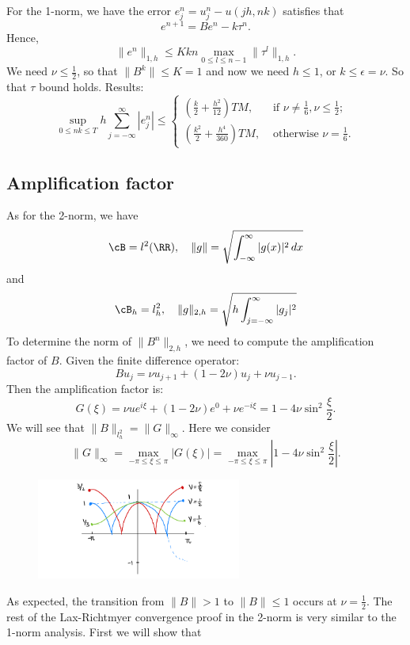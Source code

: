 For the 1-norm, we have the error $e_j^n = u_j^n - u(jh, nk)$ satisfies that 
\[
    e^{n+1} = B e^n - k \tau^n. 
\]
Hence, 
\[
    \|e^n\|_{1,h} \le K kn \max_{0\le l\le n-1} \|\tau^l\|_{1,h}. 
\]
We need $\nu\le \frac{1}{2}$, so that $\|B^k\|\le K =1$ and now we need $h\le 1$, or $k\le \epsilon = \nu$.  So that $\tau$ bound holds. Results: 
\[
    \sup_{0\le nk\le T} h \sum_{j=-\infty}^{\infty} |e_j^n| \le \begin{cases}
        \left( \frac{k}{2} + \frac{h^2}{12} \right)TM , &\text{ if } \nu \neq \frac{1}{6}, \nu \le \frac{1}{2} ;\\
        \left( \frac{k^2}{2} + \frac{h^4}{360} \right) TM, &\text{ otherwise } \nu = \frac{1}{6} .
    \end{cases} 
\]

\subsection{Amplification factor} 
As for the 2-norm,  we have 
\[
    \cB = l^2 (\RR), \quad \|g\| = \sqrt{\int_{-\infty}^{\infty} |g(x)|^2\, dx } 
\]
and 
\[
    \cB_h = l_h^2, \quad \|g\|_{2,h} = \sqrt{h \int_{j=-\infty}^{\infty} |g_j|^2 } 
\]
To determine the norm of $\|B^n\|_{2,h}$, we need to compute the amplification factor of $B$.  Given the finite difference operator: 
\[
    B u_j = \nu u_{j+1} + (1-2\nu) u_j + \nu u_{j-1}. 
\]
Then the amplification factor is: 
\[
    G(\xi) = \nu u e^{i\xi} + (1-2\nu) e^0 + \nu e^{-i\xi} = 1-4\nu \sin^2 \frac{\xi}{2}. 
\]
We will see that $\|B\|_{l_h^2} = \|G\|_\infty$.  Here we consider 
\[
    \|G\|_\infty = \max_{-\pi \le \xi \le \pi} |G(\xi)| = \max_{-\pi \le \xi \le \pi} \left| 1-4\nu \sin^2 \frac{\xi}{2} \right| . 
\]
\begin{figure}[H]
    \centering
    \includegraphics[width=0.6\textwidth]{figures/6-amplification.png}
\end{figure}
As expected, the transition from $\|B\| >1 $ to $ \|B\|\le 1 $ occurs at $\nu = \frac{1}{2}$.  The rest of the Lax-Richtmyer convergence proof in the 2-norm is very similar to the 1-norm analysis. First we will show that 
